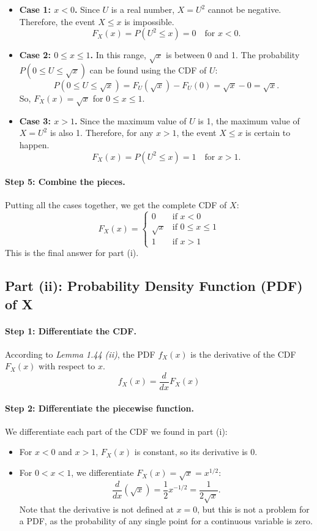 \documentclass[11pt,a4paper]{article}
\begin{document}
\begin{itemize}
    \item \textbf{Case 1: $x < 0$.} Since $U$ is a real number, $X = U^2$ cannot be negative. Therefore, the event $X \leq x$ is impossible.
    \[ F_X(x) = P(U^2 \leq x) = 0 \quad \text{for } x < 0. \]

    \item \textbf{Case 2: $0 \leq x \leq 1$.} In this range, $\sqrt{x}$ is between 0 and 1. The probability $P(0 \leq U \leq \sqrt{x})$ can be found using the CDF of $U$:
    \[ P(0 \leq U \leq \sqrt{x}) = F_U(\sqrt{x}) - F_U(0) = \sqrt{x} - 0 = \sqrt{x}. \]
    So, $F_X(x) = \sqrt{x}$ for $0 \leq x \leq 1$.

    \item \textbf{Case 3: $x > 1$.} Since the maximum value of $U$ is 1, the maximum value of $X = U^2$ is also 1. Therefore, for any $x > 1$, the event $X \leq x$ is certain to happen.
    \[ F_X(x) = P(U^2 \leq x) = 1 \quad \text{for } x > 1. \]
\end{itemize}

\paragraph{Step 5: Combine the pieces.}
Putting all the cases together, we get the complete CDF of $X$:
\[
F_X(x) =
\begin{cases}
0 & \text{if } x < 0 \\
\sqrt{x} & \text{if } 0 \leq x \leq 1 \\
1 & \text{if } x > 1
\end{cases}
\]
This is the final answer for part (i).

\subsection{Part (ii): Probability Density Function (PDF) of X}

\paragraph{Step 1: Differentiate the CDF.}
According to \textit{Lemma 1.44 (ii)}, the PDF $f_X(x)$ is the derivative of the CDF $F_X(x)$ with respect to $x$.
\[ f_X(x) = \frac{d}{dx} F_X(x) \]

\paragraph{Step 2: Differentiate the piecewise function.}
We differentiate each part of the CDF we found in part (i):
\begin{itemize}
    \item For $x < 0$ and $x > 1$, $F_X(x)$ is constant, so its derivative is 0.
    \item For $0 < x < 1$, we differentiate $F_X(x) = \sqrt{x} = x^{1/2}$:
    \[ \frac{d}{dx} (\sqrt{x}) = \frac{1}{2} x^{-1/2} = \frac{1}{2\sqrt{x}}. \]
    Note that the derivative is not defined at $x=0$, but this is not a problem for a PDF, as the probability of any single point for a continuous variable is zero.
\end{itemize}
\end{document}
